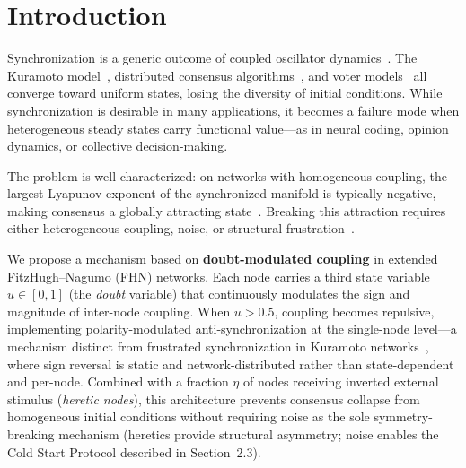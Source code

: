 ﻿\documentclass[11pt]{article}
\begin{document}
\section{Introduction}

Synchronization is a generic outcome of coupled oscillator dynamics~\cite{pikovsky2001,strogatz2000}. The Kuramoto model~\cite{acebrn2005}, distributed consensus algorithms~\cite{olfati2007}, and voter models~\cite{castellano2009} all converge toward uniform states, losing the diversity of initial conditions. While synchronization is desirable in many applications, it becomes a failure mode when heterogeneous steady states carry functional value---as in neural coding, opinion dynamics, or collective decision-making.

The problem is well characterized: on networks with homogeneous coupling, the largest Lyapunov exponent of the synchronized manifold is typically negative, making consensus a globally attracting state~\cite{jadbabaie2003}. Breaking this attraction requires either heterogeneous coupling, noise, or structural frustration~\cite{odor2024}.

We propose a mechanism based on \textbf{doubt-modulated coupling} in extended FitzHugh--Nagumo (FHN) networks. Each node carries a third state variable $u \in [0, 1]$ (the \textit{doubt} variable) that continuously modulates the sign and magnitude of inter-node coupling. When $u > 0.5$, coupling becomes repulsive, implementing polarity-modulated anti-synchronization at the single-node level---a mechanism distinct from frustrated synchronization in Kuramoto networks~\cite{odor2024}, where sign reversal is static and network-distributed rather than state-dependent and per-node. Combined with a fraction $\eta$ of nodes receiving inverted external stimulus (\textit{heretic nodes}), this architecture prevents consensus collapse from homogeneous initial conditions without requiring noise as the sole symmetry-breaking mechanism (heretics provide structural asymmetry; noise enables the Cold Start Protocol described in Section~2.3).
\end{document}

